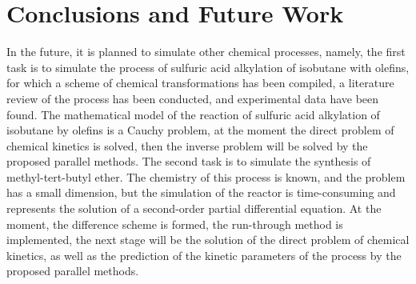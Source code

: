 \documentclass{svproc}
\begin{document}
\section{Conclusions and Future Work}


In the future, it is planned to simulate other chemical processes, namely, the first task is to simulate the process of sulfuric acid alkylation of isobutane with olefins, for which a scheme of chemical transformations has been compiled, a literature review of the process has been conducted, and experimental data have been found. The mathematical model of the reaction of sulfuric acid alkylation of isobutane by olefins is a Cauchy problem, at the moment the direct problem of chemical kinetics is solved, then the inverse problem will be solved by the proposed parallel methods. The second task is to simulate the synthesis of methyl-tert-butyl ether. The chemistry of this process is known, and the problem has a small dimension, but the simulation of the reactor is time-consuming and represents the solution of a second-order partial differential equation. At the moment, the difference scheme is formed, the run-through method is implemented, the next stage will be the solution of the direct problem of chemical kinetics, as well as the prediction of the kinetic parameters of the process by the proposed parallel methods.
\end{document}
